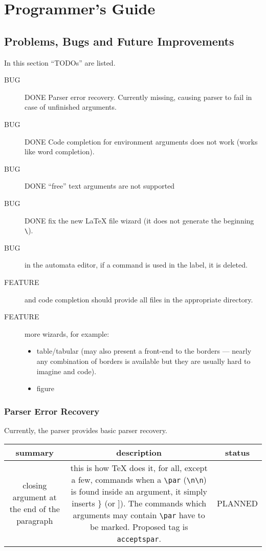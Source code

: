 \documentclass{report}
\title{\lenv}
\author{Jan Lahoda}
\newcommand{\done}{\textcolor[rgb]{0.0,1.0,0.0}{DONE}}
\begin{document}
\maketitle

\chapter{Programmer's Guide}

\section{Problems, Bugs and Future Improvements}

In this section ``TODOs'' are listed.

\begin{description}
\item[BUG]{\done{} Parser error recovery. Currently missing, causing parser to fail in case of
unfinished arguments.}
\item[BUG]{\done{} Code completion for environment arguments does not work (works like word completion).}
\item[BUG]{\done{} ``free'' text arguments are not supported}
\item[BUG]{\done{} fix the new \LaTeX{} file wizard (it does not generate the beginning \verb+\+).}
\item[BUG]{in the automata editor, if a command is used in the label, it is deleted.}
\item[FEATURE]{\verb++ and \verb++ code completion should provide
all files in the appropriate directory.}
\item[FEATURE]{more wizards, for example:
\begin{itemize}
\item{table/tabular (may also present a front-end to the borders --- nearly any combination
of borders is available but they are usually hard to imagine and code).}
\item{figure}
\end{itemize}
}
\end{description}

\subsection{Parser Error Recovery}

Currently, the parser provides basic parser recovery.

\begin{tabular}{| c | c | c |}
\hline
summary & description & status \\
\hline
\hline
closing argument at the end of the paragraph &
this is how \TeX{} does it, for all, except a few, commands when a \verb+\par+
(\verb+\n\n+) is found inside an argument, it simply inserts \} (or ]).
The commands which arguments may contain \verb+\par+ have to be marked. Proposed
tag is \verb+acceptspar+. &
PLANNED \\
\hline
\end{tabular}
\end{document}
